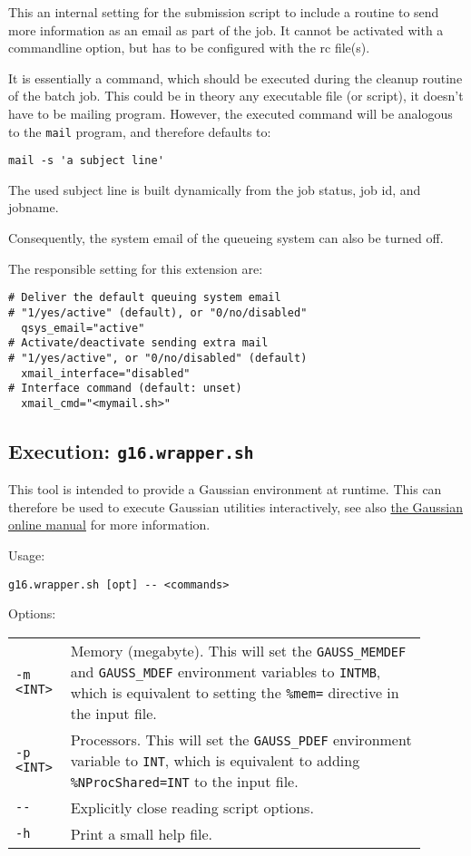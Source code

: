 \documentclass[   %
  final,          %
  a4paper         %
]{article}
\begin{document}
This an internal setting for the submission script to include a routine to send more information as an email as part of the job. 
It cannot be activated with a commandline option, but has to be configured with the rc file(s).

It is essentially a command, which should be executed during the cleanup routine of the batch job.
This could be in theory any executable file (or script), it doesn't have to be mailing program.
However, the executed command will be analogous to the \texttt{mail} program, 
and therefore defaults to:

\lstinline`mail -s 'a subject line'`

The used subject line is built dynamically from the job status, job id, and jobname.

Consequently, the system email of the queueing system can also be turned off.

The responsible setting for this extension are:

\begin{lstlisting}
# Deliver the default queuing system email
# "1/yes/active" (default), or "0/no/disabled"
  qsys_email="active"
# Activate/deactivate sending extra mail 
# "1/yes/active", or "0/no/disabled" (default)
  xmail_interface="disabled"
# Interface command (default: unset)
  xmail_cmd="<mymail.sh>"
\end{lstlisting}

\subsection{Execution: \texorpdfstring{{\lstinline`g16.wrapper.sh`}}{g16.wrapper.sh}}
\label{sec:g16.wrapper}

This tool is intended to provide a Gaussian environment at runtime.
This can therefore be used to execute Gaussian utilities interactively, see also
\href{http://gaussian.com/utils/}{the Gaussian online manual} for more information.

Usage: 

\lstinline`g16.wrapper.sh [opt] -- <commands>`

Options:

\begin{tabular}{p{0.1\linewidth}p{0.8\linewidth}}
  {\lstinline`-m <INT>`} & Memory (megabyte).\newline 
    This will set the \texttt{GAUSS\_MEMDEF} and \texttt{GAUSS\_MDEF} environment variables to \texttt{{\lstinline`INT`}MB},
    which is equivalent to setting the \texttt{\%mem=} directive in the input file.\\
  {\lstinline`-p <INT>`} & Processors.\newline 
    This will set the \texttt{GAUSS\_PDEF} environment variable to \lstinline`INT`, 
    which is equivalent to adding  \texttt{\%NProcShared={\lstinline`INT`}} to the input file. \\
  {\lstinline`--`}       & Explicitly close reading script options. \\
  {\lstinline`-h`}       & Print a small help file. \\
\end{tabular}
\end{document}
